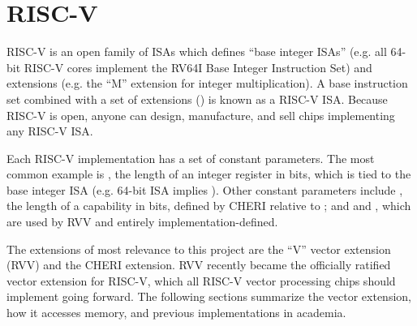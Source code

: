 \section{RISC-V}\label{chap:bg:sec:riscv}
RISC-V is an open family of ISAs which defines ``base integer ISAs'' (e.g. all 64-bit RISC-V cores implement the RV64I Base Integer Instruction Set) and extensions (e.g. the ``M'' extension for integer multiplication).
A base instruction set combined with a set of extensions () is known as a RISC-V ISA.
Because RISC-V is open, anyone can design, manufacture, and sell chips implementing any RISC-V ISA.

Each RISC-V implementation has a set of constant parameters.
The most common example is , the length of an integer register in bits, which is tied to the base integer ISA (e.g. 64-bit ISA implies ).
Other constant parameters include , the length of a capability in bits, defined by CHERI relative to ; and  and , which are used by RVV and entirely implementation-defined.

The extensions of most relevance to this project are the ``V'' vector extension (RVV) and the CHERI extension.
RVV recently became the officially ratified vector extension for RISC-V, which all RISC-V vector processing chips should implement going forward.
The following sections summarize the vector extension, how it accesses memory, and previous implementations in academia.

